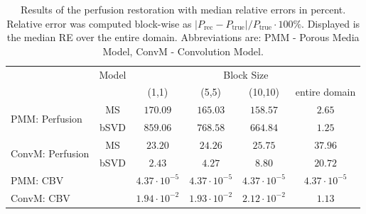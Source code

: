 \documentclass[paper=a4, fontsize=11pt,parskip=half,headings=small]{scrartcl}
\begin{document}
	\begin{table}[H]
		\caption{Results of the perfusion restoration with median relative errors in percent. Relative error was computed block-wise as $\vert P_{\mathrm{rec}} - P_{\mathrm{true}}\vert / P_{\mathrm{true}}\cdot 100\%$. Displayed is the median RE over the entire domain. Abbreviations are: PMM - Porous Media Model, ConvM - Convolution Model.}
		\centering
		\begin{tabular}{l c c c c c }
			& Model & \multicolumn{4}{c}{Block Size}\\
			 					 			& 		& (1,1) 	& (5,5)		& (10,10)	& entire domain \\
			\toprule
			\multirow{2}{*}{PMM: Perfusion} & MS 	& $170.09$ 	& $165.03$ 	& $158.57$	& $2.65$ \\
			 					 	   		& bSVD  & $859.06$ 	& $768.58$ 	& $664.84$	& $1.25$ \\
			\multirow{2}{*}{ConvM: Perfusion} & MS 	& $23.20$ 	& $24.26$ 	& $25.75$ 	& $37.96$ \\
			 					 			& bSVD  & $2.43$ 	& $4.27$ 	& $8.80$ 	& $20.72$ \\
			\midrule											
			PMM: CBV & & $4.37\cdot10^{-5}$      & $4.37\cdot10^{-5}$		& $4.37\cdot10^{-5}$		& $4.37\cdot10^{-5}$ \\											
			ConvM:  CBV & & $1.94\cdot10^{-2}$   & $1.93\cdot10^{-2}$		& $2.12\cdot10^{-2}$		& $1.13$ 			
		\end{tabular}
		\label{tab:resultsSim}
	\end{table}
\end{document}
